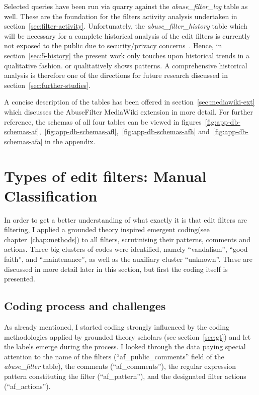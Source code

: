 Selected queries have been run via quarry against the \emph{abuse\_filter\_log} table as well.
These are the foundation for the filters activity analysis undertaken in section~\ref{sec:filter-activity}.
Unfortunately, the \emph{abuse\_filter\_history} table which will be necessary for a complete historical analysis of the edit filters is currently not exposed to the public due to security/privacy concerns~\cite{phabricator}.
Hence, in section~\ref{sec:5-history} the present work only touches upon historical trends in a qualitative fashion. %
or qualitatively shows patterns.
A comprehensive historical analysis is therefore one of the directions for future research discussed in section~\ref{sec:further-studies}.

A concise description of the tables has been offered in section~\ref{sec:mediawiki-ext} which discusses the AbuseFilter MediaWiki extension in more detail.
For further reference, the schemas of all four tables can be viewed in figures~\ref{fig:app-db-schemas-af},~\ref{fig:app-db-schemas-afl},~\ref{fig:app-db-schemas-afh} and~\ref{fig:app-db-schemas-afa} in the appendix.

\section{Types of edit filters: Manual Classification}
\label{sec:manual-classification}

In order to get a better understanding of what exactly it is that edit filters are filtering, I applied a grounded theory inspired emergent coding(see chapter~\ref{chap:methods}) to all filters, scrutinising their patterns, comments and actions.
Three big clusters of codes were identified, namely ``vandalism'', ``good faith'', and ``maintenance'', as well as the auxiliary cluster ``unknown''.
These are discussed in more detail later in this section, but first the coding itself is presented.

\subsection{Coding process and challenges}

As already mentioned, I started coding strongly influenced by the coding methodologies applied by grounded theory scholars (see section~\ref{sec:gt}) and let the labels emerge during the process.
I looked through the data paying special attention to the name of the filters (``af\_public\_comments'' field of the \emph{abuse\_filter} table), the comments (``af\_comments''), the regular expression pattern constituting the filter (``af\_pattern''), and the designated filter actions (``af\_actions'').

